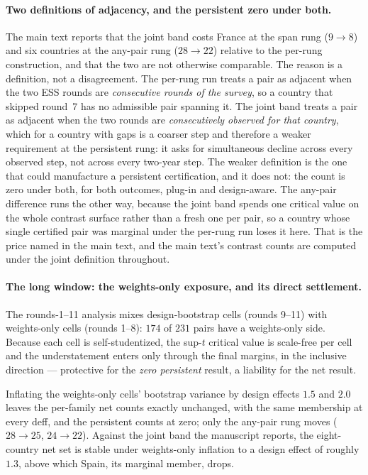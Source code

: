\documentclass[12pt]{article}
\theoremstyle{definition}
\theoremstyle{remark}
\begin{document}
\paragraph{Two definitions of adjacency, and the persistent zero under both.}
The main text reports that the joint band costs France at the span
rung ($9\to8$) and six countries at the any-pair rung ($28\to22$) relative to the
per-rung construction, and that the two are not otherwise comparable. The reason
is a definition, not a disagreement. The per-rung run treats a
pair as adjacent when the two ESS rounds are \emph{consecutive rounds of the
survey}, so a country that skipped round~7 has no admissible pair spanning it.
The joint band treats a pair as adjacent when the two rounds are
\emph{consecutively observed for that country}, which for a country with gaps is
a coarser step and therefore a weaker requirement at the persistent rung: it asks
for simultaneous decline across every observed step, not across every two-year
step. The weaker definition is the one that could manufacture a persistent
certification, and it does not: the count is zero under both, for both outcomes,
plug-in and design-aware. The any-pair difference runs the other way, because the
joint band spends one critical value on the whole contrast surface rather than a
fresh one per pair, so a country whose single certified pair was marginal under
the per-rung run loses it here. That is the price named in the main text, and
the main text's contrast counts are computed under the joint
definition throughout.

\paragraph{The long window: the weights-only exposure, and its direct
settlement.} The rounds-1--11 analysis mixes design-bootstrap
cells (rounds 9--11) with weights-only cells (rounds 1--8): $174$ of $231$
pairs have a weights-only side. Because each cell is self-studentized, the
sup-$t$ critical value is scale-free per cell and the understatement enters
only through the final margins, in the inclusive direction --- protective for
the \emph{zero persistent} result, a liability for the net result.

Inflating the weights-only cells' bootstrap variance by design effects $1.5$
and $2.0$ leaves the
per-family net counts exactly unchanged, with the same membership at every
deff, and the persistent counts at zero; only the any-pair rung moves
($28\to25$, $24\to22$). Against the joint band the manuscript reports, the
eight-country net set is stable under weights-only inflation to a design
effect of roughly $1.3$, above which Spain, its marginal member, drops.
\end{document}
